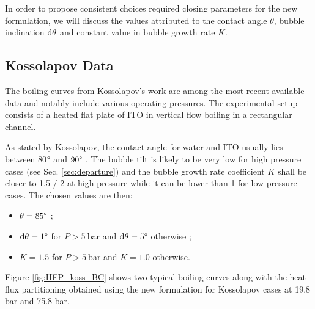 \npar

In order to propose consistent choices required closing parameters for the new formulation, we will discuss the values attributed to the contact angle $\theta$, bubble inclination $\mathrm{d}\theta$ and constant value in bubble growth rate $K$.


\subsection{Kossolapov Data}
\label{subsec:HFP_verif_koss}

The boiling curves from Kossolapov's work \cite{kossolapov_experimental_2021} are among the most recent available data and notably include various operating pressures. The experimental setup consists of a heated flat plate of ITO in vertical flow boiling in a rectangular channel.


\npar

As stated by Kossolapov, the contact angle for water and ITO usually lies between 80$\degree$ and $90\degree$ \cite{kossolapov_experimental_2021}. The bubble tilt is likely to be very low for high pressure cases (see Sec. \ref{sec:departure}) and the bubble growth rate coefficient $K$ shall be closer to 1.5 / 2 at high pressure while it can be lower than 1 for low pressure cases. The chosen values are then:

\begin{itemize}
\item $\theta = 85 \degree$ ;
\item $\mathrm{d}\theta = 1 \degree$ for $P > 5\ $bar and $\mathrm{d}\theta = 5 \degree$ otherwise ;
\item $K = 1.5$ for $P > 5\ $bar and $K=1.0$ otherwise.
\end{itemize}


Figure \ref{fig:HFP_koss_BC} shows two typical boiling curves along with the heat flux partitioning obtained using the new formulation for Kossolapov cases at 19.8 bar and 75.8 bar.


